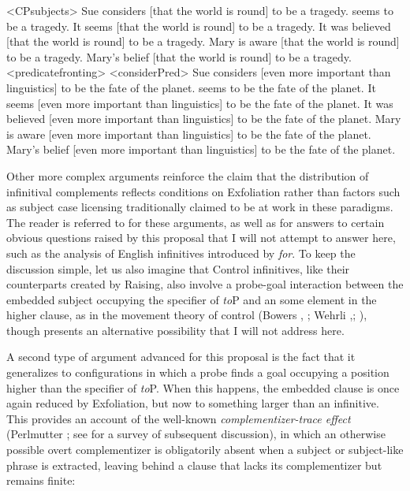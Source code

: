 \documentclass[output=paper]{langscibook}
\begin{document}
\noindent \noindent {}
\pex<CPsubjects>  
\a Sue considers [that the world is round] to be a tragedy.
 seems to be a tragedy. 
\a \ljudge*It seems [that the world is round] to be a tragedy.
\a \ljudge*It was believed [that the world is round] to be a tragedy.
\a \ljudge*Mary is aware [that the world is round] to be a tragedy.
\a  \ljudge*Mary's belief [that the world is round] to be a tragedy.
\xe
\pex[aboveexskip=0pt]<predicatefronting>
\a<considerPred> Sue considers [even more important than linguistics] to be the fate of the planet.
 seems to be the fate of the planet. 
\a \ljudge*It seems [even more important than linguistics] to be the fate of the planet. 
\a \ljudge*It was believed [even more important than linguistics] to be the fate of the planet. 
\a \ljudge*Mary is aware [even more important than linguistics] to be the fate of the planet.
\a \ljudge*Mary's belief [even more important than linguistics] to be the fate of the planet. 
\xe

\noindent Other more complex arguments reinforce the claim that the distribution of infinitival complements reflects conditions on Exfoliation rather than factors such as subject case licensing traditionally claimed to be at work in these paradigms. The reader is referred to \citet{Pesetsky:2019aa} for these arguments, as well as for answers to certain obvious questions raised by this proposal that I will not attempt to answer here, such as the analysis of English infinitives introduced by \textit{for}. To keep the discussion simple, let us also imagine that Control infinitives, like their counterparts created by Raising, also involve a probe-goal interaction between the embedded subject occupying the specifier of \textit{to}P and an some element in the higher clause, as in the movement theory of control (Bowers \citeyear[675 ff.]{Bowers1973}, \citeyear{bowers}; Wehrli \citeyear[115-131]{Wehrli1980},\citeyear{Wehrli1981}; \citealt{Hornstein1999b}), though \citet{Pesetsky:2019aa} presents an alternative possibility that I will not address here.

A second type of argument advanced for this proposal is the fact that it generalizes to configurations in which a probe finds a goal occupying a position higher than the specifier of \textit{to}P. When this happens, the embedded clause is once again reduced by Exfoliation, but now to something larger than an infinitive. This provides an account of the well-known \textit{complementizer-trace effect }(Perlmutter \citeyear{Perlmutter1968,Perlmutter:1971}; see \citealt{pesetsky2015complementizer} for a survey of subsequent discussion), in which an otherwise possible overt complementizer is obligatorily absent when a subject or subject-like phrase is extracted, leaving behind a clause that lacks its complementizer but remains finite:
\end{document}
